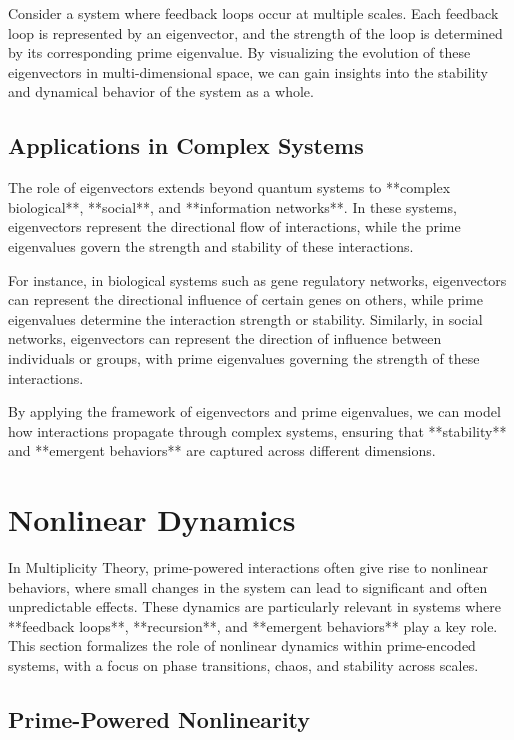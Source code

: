 \documentclass[12pt]{article}
\begin{document}
Consider a system where feedback loops occur at multiple scales. Each feedback loop is represented by an eigenvector, and the strength of the loop is determined by its corresponding prime eigenvalue. By visualizing the evolution of these eigenvectors in multi-dimensional space, we can gain insights into the stability and dynamical behavior of the system as a whole.

\subsection{Applications in Complex Systems}

The role of eigenvectors extends beyond quantum systems to **complex biological**, **social**, and **information networks**. In these systems, eigenvectors represent the directional flow of interactions, while the prime eigenvalues govern the strength and stability of these interactions.

For instance, in biological systems such as gene regulatory networks, eigenvectors can represent the directional influence of certain genes on others, while prime eigenvalues determine the interaction strength or stability. Similarly, in social networks, eigenvectors can represent the direction of influence between individuals or groups, with prime eigenvalues governing the strength of these interactions.

By applying the framework of eigenvectors and prime eigenvalues, we can model how interactions propagate through complex systems, ensuring that **stability** and **emergent behaviors** are captured across different dimensions.


\section{Nonlinear Dynamics}

In Multiplicity Theory, prime-powered interactions often give rise to nonlinear behaviors, where small changes in the system can lead to significant and often unpredictable effects. These dynamics are particularly relevant in systems where **feedback loops**, **recursion**, and **emergent behaviors** play a key role. This section formalizes the role of nonlinear dynamics within prime-encoded systems, with a focus on phase transitions, chaos, and stability across scales.

\subsection{Prime-Powered Nonlinearity}
\end{document}
